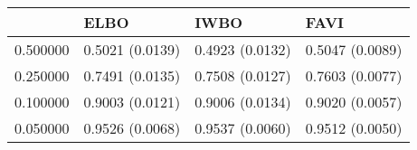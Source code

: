 \begin{tabular}{llll}
\toprule
 & ELBO & IWBO & FAVI \\
\midrule
0.500000 & 0.5021 (0.0139) & 0.4923 (0.0132) & 0.5047 (0.0089) \\
0.250000 & 0.7491 (0.0135) & 0.7508 (0.0127) & 0.7603 (0.0077) \\
0.100000 & 0.9003 (0.0121) & 0.9006 (0.0134) & 0.9020 (0.0057) \\
0.050000 & 0.9526 (0.0068) & 0.9537 (0.0060) & 0.9512 (0.0050) \\
\bottomrule
\end{tabular}
